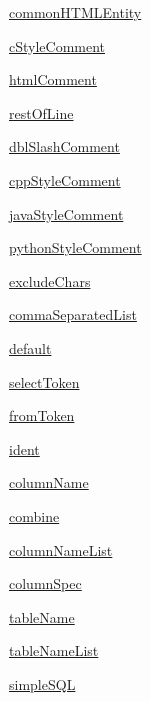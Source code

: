 \begin{DoxyCompactItemize}
\item 
\hyperlink{namespacepyparsing_a6d28fa11d5129a845c510f8b1c95d5db}{common\+H\+T\+M\+L\+Entity}
\item 
\hyperlink{namespacepyparsing_a6e3b9caf64e1ab2062eb456c83fd60bb}{c\+Style\+Comment}
\item 
\hyperlink{namespacepyparsing_a31d6b3c2621c7ee5fce8a4f4ff920826}{html\+Comment}
\item 
\hyperlink{namespacepyparsing_a1629e0f70e54804d41c13c042c99d7c9}{rest\+Of\+Line}
\item 
\hyperlink{namespacepyparsing_a78f004a9a6f08bdd699b70210724a9b2}{dbl\+Slash\+Comment}
\item 
\hyperlink{namespacepyparsing_ad628fe6a4713164892174183fdf408c4}{cpp\+Style\+Comment}
\item 
\hyperlink{namespacepyparsing_aaf99577452dceda33ce9a94cac87bdc7}{java\+Style\+Comment}
\item 
\hyperlink{namespacepyparsing_abf3cd0b4b911951b53e88978b03b2d7e}{python\+Style\+Comment}
\item 
\hyperlink{namespacepyparsing_a74a0d58c5c3028ec3baa9b4db4a9a9f0}{exclude\+Chars}
\item 
\hyperlink{namespacepyparsing_ab20829dba0badd12b633306b6e947568}{comma\+Separated\+List}
\item 
\hyperlink{namespacepyparsing_af718ddc22535044334309aa6db3c8bb9}{default}
\item 
\hyperlink{namespacepyparsing_a40b34d438ee87b3e8ae2e84f371f0e4d}{select\+Token}
\item 
\hyperlink{namespacepyparsing_ab4ff54360a77decc8f7a39f8a09e781b}{from\+Token}
\item 
\hyperlink{namespacepyparsing_ac1f47b83b95624ba10c0fe5884afa784}{ident}
\item 
\hyperlink{namespacepyparsing_a39b7738fa924d5b7f5e7d618b7977288}{column\+Name}
\item 
\hyperlink{namespacepyparsing_a0126ec62225fec124646aff2b8e03a09}{combine}
\item 
\hyperlink{namespacepyparsing_a62e51d98617e05187ba5fd6cf5921d7b}{column\+Name\+List}
\item 
\hyperlink{namespacepyparsing_af132d884d4b4dff49793ed88314e000a}{column\+Spec}
\item 
\hyperlink{namespacepyparsing_a99b6235d1239f50a062716d8e1df305a}{table\+Name}
\item 
\hyperlink{namespacepyparsing_a7fa9d94a72a7f9f75d582cce8539e11c}{table\+Name\+List}
\item 
\hyperlink{namespacepyparsing_a6247ca830771f5336f5595ce38aae4e5}{simple\+S\+QL}
\end{DoxyCompactItemize}


